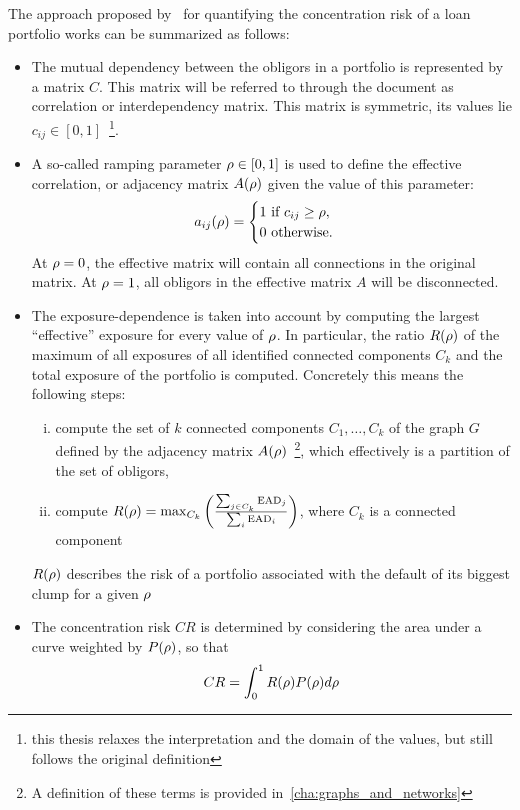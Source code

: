 \documentclass[12pt,beltcrest]{ociamthesis} %
\begin{document}
The approach proposed by~\cite{Sindel:2009vd} for quantifying the concentration risk of a loan portfolio works can be summarized as follows:
\begin{itemize}
	\item The mutual dependency between the obligors in a portfolio is represented by a matrix $C$.
	This matrix will be referred to through the document as correlation or interdependency matrix.
	This matrix is symmetric, its values lie $c_{ij} \in [0,1]$~\footnote{this thesis relaxes the interpretation and the domain of the values, but still follows the original definition}.

	\item A so-called ramping parameter $\rho \in [0,1]$ is used to define the effective correlation, or adjacency matrix $A(\rho)$ given the value of this  parameter:
	\begin{equation}
	a_{ij}(\rho) = 
		\begin{cases}
		1 \text{ if } c_{ij} \ge \rho,\\
		0 \text{ otherwise}.
		\end{cases}
	\end{equation}
	At $\rho = 0$, the effective matrix will contain all connections in the original matrix. At $\rho = 1$, all obligors in the effective matrix $A$ will be disconnected.
	
	\item The exposure-dependence is taken into account by computing the largest “effective” exposure for every value of $\rho$.
	In particular, the ratio $R(\rho)$ of the maximum of all exposures of all identified connected components $C_k$ and the total exposure of the portfolio is computed. Concretely this means the following steps:
	\begin{enumerate}[i)]
		\item compute the set of $k$ connected components $C_1,\ldots,C_k$ of the graph $G$ defined by the adjacency matrix $A(\rho)$~\footnote{A definition of these terms is provided in~\ref{cha:graphs_and_networks}}, which effectively is a partition of the set of obligors,
		\item compute $R(\rho) = \max_{C_k} \left(  \frac{\sum_{j\in C_k} \textrm{EAD}_j}{\sum_i \textrm{EAD}_i}  \right)$, where $C_k$ is a connected component
	\end{enumerate}
	$R(\rho)$ describes the risk of a portfolio associated with the default of its biggest clump for a given $\rho$
 
	\item The concentration risk $CR$ is determined by considering the area under a curve weighted by $P(\rho)$, so that 
	\begin{equation}
	 	CR = \int_0^1 R(\rho)P(\rho)d\rho
	 \end{equation}
\end{itemize}
\end{document}
